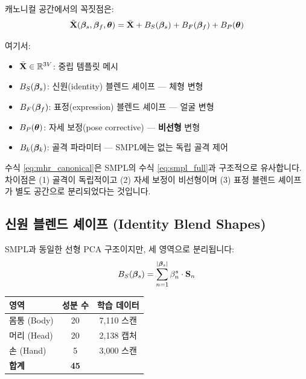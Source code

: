 \documentclass[11pt, a4paper]{report}
\begin{document}
캐노니컬 공간에서의 꼭짓점은:
\begin{equation}
\tilde{\mathbf{X}}(\bm{\beta}_s, \bm{\beta}_f, \bm{\theta}) = \bar{\mathbf{X}} + B_S(\bm{\beta}_s) + B_F(\bm{\beta}_f) + B_P(\bm{\theta})
\label{eq:mhr_canonical}
\end{equation}

여기서:
\begin{itemize}[leftmargin=*]
  \item $\bar{\mathbf{X}} \in \mathbb{R}^{3V}$: 중립 템플릿 메시
  \item $B_S(\bm{\beta}_s)$: 신원(identity) 블렌드 셰이프 --- 체형 변형
  \item $B_F(\bm{\beta}_f)$: 표정(expression) 블렌드 셰이프 --- 얼굴 변형
  \item $B_P(\bm{\theta})$: 자세 보정(pose corrective) --- \textbf{비선형} 변형
  \item $B_k(\bm{\beta}_k)$: 골격 파라미터 --- SMPL에는 없는 독립 골격 제어
\end{itemize}

\begin{remark}
수식 \eqref{eq:mhr_canonical}은 SMPL의 수식 \eqref{eq:smpl_full}과 구조적으로 유사합니다. 차이점은 (1) 골격이 독립적이고 (2) 자세 보정이 비선형이며 (3) 표정 블렌드 셰이프가 별도 공간으로 분리되었다는 것입니다.
\end{remark}


\subsection{신원 블렌드 셰이프 (Identity Blend Shapes)}

SMPL과 동일한 선형 PCA 구조이지만, 세 영역으로 분리됩니다:
\begin{equation}
B_S(\bm{\beta}_s) = \sum_{n=1}^{|\bm{\beta}_s|} \beta_n^s \cdot \mathbf{S}_n
\end{equation}

\begin{center}
\renewcommand{\arraystretch}{1.2}
\begin{tabular}{lcc}
\toprule
\textbf{영역} & \textbf{성분 수} & \textbf{학습 데이터} \\
\midrule
몸통 (Body) & 20 & 7,110 스캔 \\
머리 (Head) & 20 & 2,138 캡처 \\
손 (Hand) & 5 & 3,000 스캔 \\
\midrule
\textbf{합계} & \textbf{45} & \\
\bottomrule
\end{tabular}
\end{center}
\end{document}
